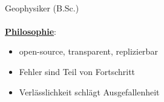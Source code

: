 \documentclass{article}
\begin{document}
\begin{mdframed}[backgroundcolor=anti-flashwhite]
	\begin{minipage}[t]{0.4\textwidth}
	{\fontsize{30pt}{62pt}\color{gray} }\\
    {\fontsize{14pt}{24pt}\color{pblue} \selectfont Geophysiker \color{lightgray} (B.Sc.)}\\\\
    \textbf{\underline{Philosophie}}:
    \begin{itemize}
    \item open-source, transparent, replizierbar
    \item Fehler sind Teil von Fortschritt
    \item Verlässlichkeit schlägt Ausgefallenheit
    \end{itemize}
	\end{minipage}
	\hfill
	\vrule
	\hfill
	\begin{minipage}[t]{0.2\textwidth}
	\vspace{0cm}
\end{minipage}
\end{mdframed}
\end{document}
